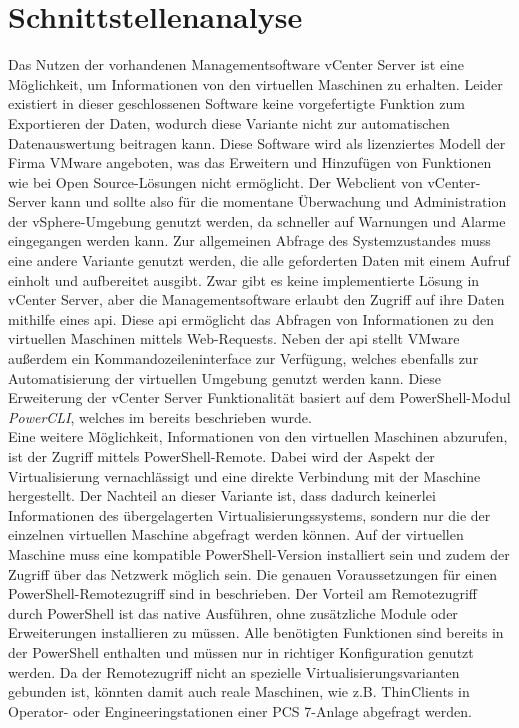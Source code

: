 \section{Schnittstellenanalyse}
\begin{comment}
Schnittstellenanalyse am Virtualisierungssystem und Auswahl der Entwicklungsumgebung\\
Erörterung der Anwendungsumgebung\\
Rahmenbedingungen der Anwendung\\
\end{comment}
Das Nutzen der vorhandenen Managementsoftware vCenter Server ist eine Möglichkeit, um Informationen von den virtuellen Maschinen zu erhalten. Leider existiert in dieser geschlossenen Software keine vorgefertigte Funktion zum Exportieren der Daten, wodurch diese Variante nicht zur automatischen Datenauswertung beitragen kann. Diese Software wird als lizenziertes Modell der Firma VMware angeboten, was das Erweitern und Hinzufügen von Funktionen wie bei Open Source-Lösungen nicht ermöglicht. Der Webclient von vCenter-Server kann und sollte also für die momentane Überwachung und Administration der vSphere-Umgebung genutzt werden, da schneller auf Warnungen und Alarme eingegangen werden kann. Zur allgemeinen Abfrage des Systemzustandes muss eine andere Variante genutzt werden, die alle geforderten Daten mit einem Aufruf einholt und aufbereitet ausgibt. Zwar gibt es keine implementierte Lösung in vCenter Server, aber die Managementsoftware erlaubt den Zugriff auf ihre Daten mithilfe eines \acrfull{api}. Diese \acrshort{api} ermöglicht das Abfragen von Informationen zu den virtuellen Maschinen mittels Web-Requests. Neben der \acrshort{api} stellt VMware außerdem ein Kommandozeileninterface zur Verfügung, welches ebenfalls zur Automatisierung der virtuellen Umgebung genutzt werden kann. Diese Erweiterung der vCenter Server Funktionalität basiert auf dem PowerShell-Modul \textit{PowerCLI}, welches im  bereits beschrieben wurde.\medskip\\
Eine weitere Möglichkeit, Informationen von den virtuellen Maschinen abzurufen, ist der Zugriff mittels PowerShell-Remote. Dabei wird der Aspekt der Virtualisierung vernachlässigt und eine direkte Verbindung mit der Maschine hergestellt. Der Nachteil an dieser Variante ist, dass dadurch keinerlei Informationen des übergelagerten Virtualisierungssystems, sondern nur die der einzelnen virtuellen Maschine abgefragt werden können. Auf der virtuellen Maschine muss eine kompatible PowerShell-Version installiert sein und zudem der Zugriff über das Netzwerk möglich sein. Die genauen Voraussetzungen für einen PowerShell-Remotezugriff sind in  beschrieben. Der Vorteil am Remotezugriff durch PowerShell ist das native Ausführen, ohne zusätzliche Module oder Erweiterungen installieren zu müssen. Alle benötigten Funktionen sind bereits in der PowerShell enthalten und müssen nur in richtiger Konfiguration genutzt werden. Da der Remotezugriff nicht an spezielle Virtualisierungsvarianten gebunden ist, könnten damit auch reale Maschinen, wie z.B. ThinClients in Operator- oder Engineeringstationen einer PCS 7-Anlage abgefragt werden.

